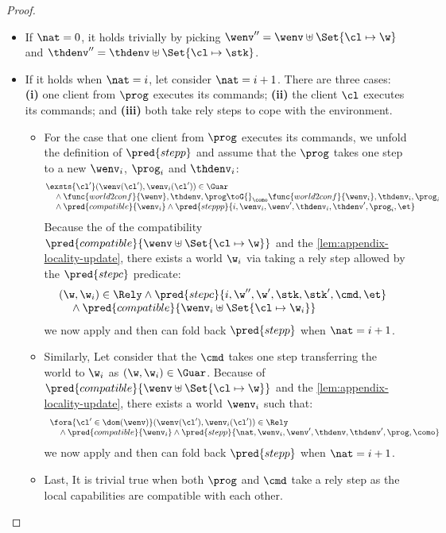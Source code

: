\begin{proof}
\begin{itemize}
\begin{itemize}
    \item If \( \nat = 0\), it holds trivially by picking \( \wenv'' = \wenv \uplus \Set{\cl \mapsto \w} \) and \( \thdenv'' = \thdenv \uplus \Set{\cl \mapsto \stk}\).

    \item If it holds when \( \nat = i\), let consider \( \nat = i + 1\).
    There are three cases: \textbf{(i)} one client from \( \prog \) executes its commands; \textbf{(ii)} the client \( \cl \) executes its commands; and \textbf{(iii)} both take rely steps to cope with the environment.
    \begin{itemize}
        \item For the case that one client from \( \prog \) executes its commands, we unfold the definition of \( \pred{stepp} \) and assume that the \( \prog \) takes one step to a new \( \wenv_i\), \( \prog_i \) and \( \thdenv_i \):
        \[
        \begin{array}{@{}l}
            \exsts{\cl'} (\wenv(\cl'), \wenv_i(\cl')) \in \Guar \\ 
            \quad {} \land \func{world2conf}{\wenv}, \thdenv, \prog \toG{}_{\como} \func{world2conf}{\wenv_i}, \thdenv_i, \prog_i  \\
            \quad {} \land \pred{compatible}{\wenv_i} \land \pred{steppp}{i, \wenv_i, \wenv', \thdenv_i, \thdenv', \prog_i, \et}
        \end{array}
        \]
        Because the of the compatibility \( \pred{compatible}{\wenv \uplus \Set{\cl \mapsto \w}} \) and the \cref{lem:appendix-locality-update}, there exists a world \( \w_i\) via taking a rely step allowed by the \( \pred{stepc} \) predicate:
        \[
        \begin{array}{@{}l}
            (\w, \w_i) \in \Rely \land \pred{stepc}{i, \w'', \w', \stk, \stk', \cmd, \et} \\
            \quad {} \land \pred{compatible}{\wenv_i \uplus \Set{\cl \mapsto \w_i}}
        \end{array}
        \]
        we now apply \ih and then can fold back \( \pred{stepp} \) when \( \nat = i + 1 \).
        \item Similarly, Let consider that the \( \cmd \) takes one step transferring the world to \( \w_i \) as \( (\w, \w_i) \in \Guar \).
        Because of \( \pred{compatible}{\wenv \uplus \Set{\cl \mapsto \w}} \) and the \cref{lem:appendix-locality-update}, there exists a world \( \wenv_i\) such that:
        \[
            \begin{array}{l}
            \fora{\cl' \in \dom(\wenv)} (\wenv(\cl'), \wenv_i(\cl')) \in \Rely \\
            \quad {} \land \pred{compatible}{\wenv_i} \land \pred{stepp}{ \nat, \wenv_i, \wenv', \thdenv, \thdenv',\prog, \como} 
            \end{array}
        \]
        we now apply \ih and then can fold back \( \pred{stepp} \) when \( \nat = i + 1 \).
        \item Last, It is trivial true when both \( \prog\) and \( \cmd \) take a rely step as the local capabilities are compatible with each other.


\end{itemize}
\end{itemize}
\end{itemize}
\end{proof}
